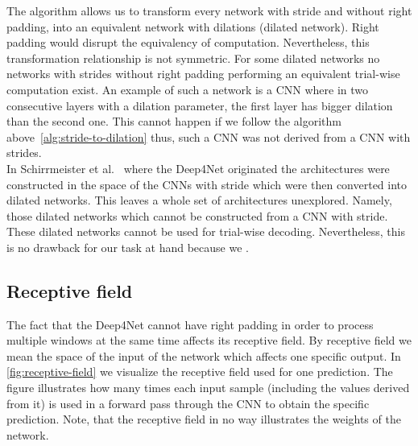 The algorithm allows us to transform every network with stride and without right padding, into an equivalent network with dilations (dilated network).
Right padding would disrupt the equivalency of computation.
Nevertheless, this transformation relationship is not symmetric.
For some dilated networks no networks with strides without right padding performing an equivalent trial-wise computation exist.
An example of such a network is a CNN where in two consecutive layers with a dilation parameter, the first layer has bigger dilation than the second one.
This cannot happen if we follow the algorithm above~\ref{alg:stride-to-dilation} thus, such a CNN was not derived from a CNN with strides. \\

In Schirrmeister et al.~\cite{schirrmeister-deep-2017} where the Deep4Net originated the architectures were constructed in the space of the CNNs with stride which were then converted into dilated networks.
This leaves a whole set of architectures unexplored.
Namely, those dilated networks which cannot be constructed from a CNN with stride.
These dilated networks cannot be used for trial-wise decoding.
Nevertheless, this is no drawback for our task at hand because we .


\subsection{Receptive field}\label{subsec:receptive-field}
The fact that the Deep4Net cannot have right padding in order to process multiple windows at the same time affects its receptive field.
By receptive field we mean the space of the input of the network which affects one specific output.
In \cref{fig:receptive-field} we visualize the receptive field used for one prediction.
The figure illustrates how many times each input sample (including the values derived from it) is used in a forward pass through the CNN to obtain the specific prediction.
Note, that the receptive field in no way illustrates the weights of the network.

